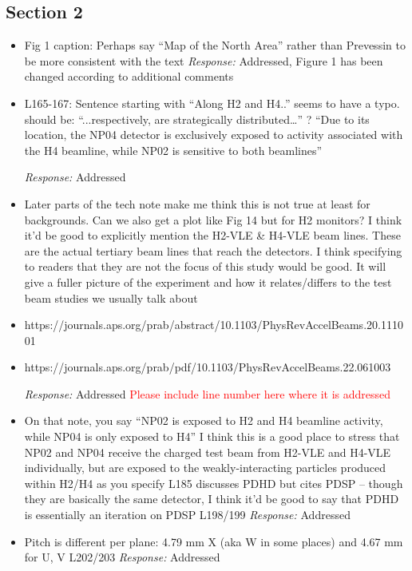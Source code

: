 \documentclass[11pt]{article}
\begin{document}
\subsection*{Section 2}
\begin{itemize}
    \item Fig 1 caption: Perhaps say “Map of the North Area” rather than Prevessin to be more consistent with the text
    \textit{Response:} Addressed, Figure 1 has been changed according to additional comments
    
    \item L165-167: Sentence starting with “Along H2 and H4..” seems to have a typo. should be: “...respectively, are strategically distributed…” ? “Due to its location, the NP04 detector is exclusively exposed to activity associated with the H4 beamline, while NP02 is sensitive to both beamlines”

    \textit{Response:} Addressed
    
    \item Later parts of the tech note make me think this is not true at least for backgrounds. Can we also get a plot like Fig 14 but for H2 monitors? I think it’d be good to explicitly mention the H2-VLE \& H4-VLE beam lines. These are the actual tertiary beam lines that reach the detectors. I think specifying to readers that they are not the focus of this study would be good. It will give a fuller picture of the experiment and how it relates/differs to the test beam studies we usually talk about
    \item https://journals.aps.org/prab/abstract/10.1103/PhysRevAccelBeams.20.111001
    \item https://journals.aps.org/prab/pdf/10.1103/PhysRevAccelBeams.22.061003

    \textit{Response:} Addressed \textcolor{red}{Please include line number here where it is addressed}
    
    \item On that note, you say “NP02 is exposed to H2 and H4 beamline activity, while NP04 is only exposed to H4” I think this is a good place to stress that NP02 and NP04 receive the charged test beam from H2-VLE and H4-VLE individually, but are exposed to the weakly-interacting particles produced within H2/H4 as you specify L185 discusses PDHD but cites PDSP – though they are basically the same detector, I think it’d be good to say that PDHD is essentially an iteration on PDSP L198/199
     \textit{Response:} Addressed
    
    \item Pitch is different per plane: 4.79 mm X (aka W in some places) and 4.67 mm for U, V L202/203
    \textit{Response:} Addressed
    

\end{itemize}
\end{document}
